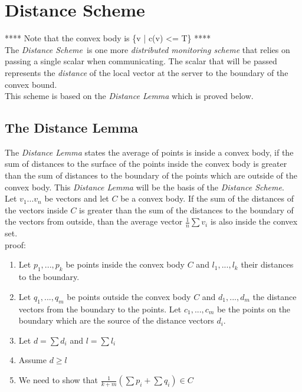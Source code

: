 \documentclass[10pt, conference]{IEEEtran}
\newcommand{\distanceScheme}{\textit{Distance Scheme}}
\begin{document}
\section{Distance Scheme}
**** Note that the convex body is \{v | c(v) <= T\} ****\\
The \distanceScheme \ is one more \textit{distributed monitoring scheme} that relies on passing a single scalar when communicating. The scalar that will be passed represents the \textit{distance} of the local vector at the server to the boundary of the convex bound.\\
This scheme is based on the \textit{Distance Lemma} which is proved below.

\subsection{The Distance Lemma}
The \textit{Distance Lemma} states the average of points is inside a convex body, if the sum of distances to the surface of the points inside the convex body is greater than the sum of distances to the boundary of the points which are outside of the convex body. This \textit{Distance Lemma} will be the basis of the \distanceScheme . \\
Let ${v_1 ... v_n}$ be vectors and let $C$ be a convex body. If the sum of the distances of the vectors inside $C$ is greater than the sum of the distances to the boundary of the vectors from outside, than the average vector $\frac{1}{n}\sum {v_i}$ is also inside the convex set. \\
proof: \\
\begin{enumerate}
\item Let $p_1 ,..., p_k$ be points inside the convex body $C$ and $l_1 ,..., l_k$ their distances to the boundary.
\item Let $q_1 ,..., q_m$ be points outside the convex body $C$ and $d_1 ,..., d_m$ the distance vectors from the boundary to the points. Let $c_1 ,..., c_m$ be the points on the boundary which are the source of the distance vectors $d_i$.
\item Let $d = \sum {d_i}$ and $l = \sum {l_i}$
\item Assume $d \geq l$
\item We need to show that $\frac{1}{k+m}(\sum{p_i} + \sum{q_i}) \in C$ 
\end{enumerate}
\end{document}
